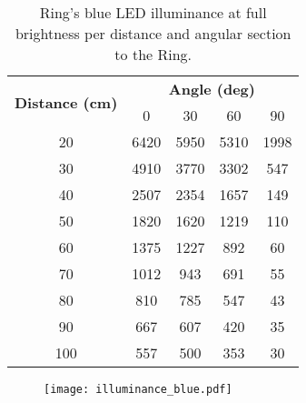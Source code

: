 \begin{table}[h!]
	\centering
	\caption{Ring's blue LED illuminance at full brightness per distance and angular section to the Ring.}
	\label{table:illuminance_blue}
	\begin{tabular}{ccccc}
		\hline
		\hline
		\toprule
		\multirow{2}{*}{\textbf{Distance (cm)}} & \multicolumn{4}{c}{\textbf{Angle (deg)}}\\
		& 0 & 30 & 60 & 90 \\
		\bottomrule
		\toprule
		20	&	6420	&	5950	&	5310	&	1998	\\
		30	&	4910	&	3770	&	3302	&	547		\\
		40	&	2507	&	2354	&	1657	&	149		\\
		50	&	1820	&	1620	&	1219	&	110		\\
		60	&	1375	&	1227	&	892		&	60		\\
		70	&	1012	&	943		&	691		&	55		\\
		80	&	810		&	785		&	547		&	43		\\
		90	&	667		&	607		&	420		&	35		\\
		100	&	557		&	500		&	353		&	30		\\
		\bottomrule
		\hline
		\hline
	\end{tabular}
\end{table}
\begin{figure}[ht]
	\centering
	\texttt{[image: illuminance\_blue.pdf]}
	\caption{}
	\label{fig:illuminance_blue}
\end{figure}

